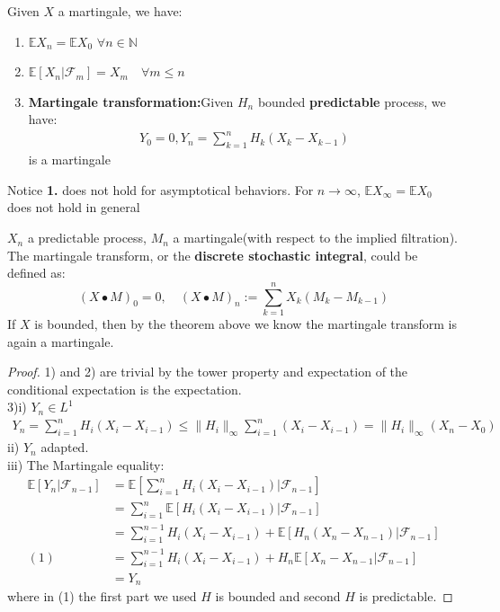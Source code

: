 \begin{theorem}
	Given $X$ a martingale, we have:
	\begin{enumerate}
		\item $\mathbb{E} X_n = \mathbb{E} X_0$ $ \forall n \in \mathbb{N}$
		\item $\mathbb{E}[X_n |\mathcal{F}_m] = X_m \quad \forall m \leq n$
		\item \textbf{Martingale transformation:}Given $H_n$ bounded \textbf{predictable} process, we have:
		\begin{align*}
			Y_0 = 0, Y_n = \sum_{k = 1}^n H_k(X_k - X_{k-1})
		\end{align*}
		is a martingale 
	\end{enumerate}
\end{theorem}
\begin{remark}
Notice \textbf{1.} does not hold for asymptotical behaviors. For $n \rightarrow \infty$, $\mathbb{E}X_\infty = \mathbb{E}X_0$ does not hold in general
\end{remark}
\begin{remark}
$X_n$ a predictable process, $M_n$ a martingale(with respect to the implied filtration). The martingale transform, or the \textbf{discrete stochastic integral}, could be defined as:
\begin{equation*}
	(X\bullet M)_0 = 0, \quad (X \bullet M)_n := \sum_{k = 1}^n X_k(M_k - M_{k-1}) 
\end{equation*}
If $X$ is bounded, then by the theorem above we know the martingale transform is again a martingale.
\end{remark}
\begin{proof}
	1) and 2) are trivial by the tower property and expectation of the conditional expectation is the expectation.\\
	3)i) $Y_n \in L^1$
	\begin{align*}
		Y_n = \sum_{i = 1}^n H_i(X_i - X_{i-1}) \leq \|H_i\|_\infty \sum_{i = 1}^n(X_i - X_{i-1}) = \|H_i\|_\infty (X_n - X_0)
	\end{align*} 
	ii) $Y_n$ adapted.\\
	iii) The Martingale equality:
	\begin{align*}
		\mathbb{E}[Y_n | \mathcal{F}_{n-1}] &= \mathbb{E}[\sum_{i = 1}^nH_i(X_i - X_{i -1})|\mathcal{F}_{n-1}]\\
		&= \sum_{i = 1}^n \mathbb{E}[H_i(X_i - X_{i-1})|\mathcal{F}_{n-1}]\\
		&= \sum_{i = 1}^{n-1} H_i(X_i - X_{i -1}) +  \mathbb{E}[H_n(X_n - X_{n -1})| \mathcal{F}_{n-1}]\\
	(1)	&= \sum_{i = 1}^{n-1} H_i(X_i - X_{i -1}) + H_n\mathbb{E}[X_n - X_{n-1}|\mathcal{F}_{n-1}] \\
		&= Y_n
	\end{align*}
	where in (1) the first part we used $H$ is bounded and second $H$ is predictable.
\end{proof}

